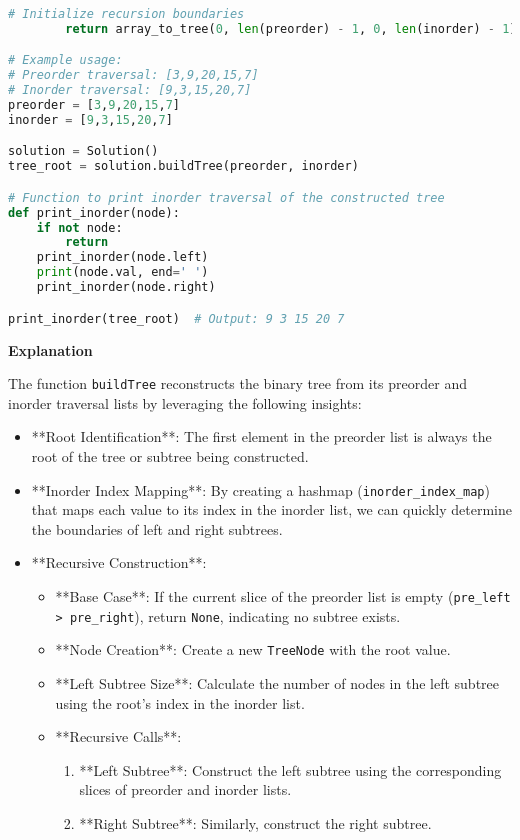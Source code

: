 \begin{lstlisting}[language=Python, xleftmargin=0.02\textwidth, xrightmargin=0.02\textwidth]
        # Initialize recursion boundaries
        return array_to_tree(0, len(preorder) - 1, 0, len(inorder) - 1)

# Example usage:
# Preorder traversal: [3,9,20,15,7]
# Inorder traversal: [9,3,15,20,7]
preorder = [3,9,20,15,7]
inorder = [9,3,15,20,7]

solution = Solution()
tree_root = solution.buildTree(preorder, inorder)

# Function to print inorder traversal of the constructed tree
def print_inorder(node):
    if not node:
        return
    print_inorder(node.left)
    print(node.val, end=' ')
    print_inorder(node.right)

print_inorder(tree_root)  # Output: 9 3 15 20 7 
\end{lstlisting}

\textbf{Explanation}

The function \texttt{buildTree} reconstructs the binary tree from its preorder and inorder traversal lists by leveraging the following insights:

\begin{itemize}
    \item **Root Identification**: The first element in the preorder list is always the root of the tree or subtree being constructed.
    \item **Inorder Index Mapping**: By creating a hashmap (\texttt{inorder\_index\_map}) that maps each value to its index in the inorder list, we can quickly determine the boundaries of left and right subtrees.
    \item **Recursive Construction**:
    \begin{itemize}
        \item **Base Case**: If the current slice of the preorder list is empty (\texttt{pre\_left > pre\_right}), return \texttt{None}, indicating no subtree exists.
        \item **Node Creation**: Create a new \texttt{TreeNode} with the root value.
        \item **Left Subtree Size**: Calculate the number of nodes in the left subtree using the root's index in the inorder list.
        \item **Recursive Calls**: 
        \begin{enumerate}
            \item **Left Subtree**: Construct the left subtree using the corresponding slices of preorder and inorder lists.
            \item **Right Subtree**: Similarly, construct the right subtree.
        \end{enumerate}
    \end{itemize}
\end{itemize}

